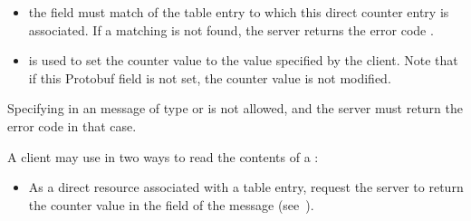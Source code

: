 \documentclass[11pt]{article}
\begin{document}
{\begin{itemize}
\item{}
the  field must match  of the table entry
to which this direct counter entry is associated. If a matching 
is not found, the server returns the error code .%

\item{}
 is used to set the counter value to the value specified by the
client. Note that if this Protobuf field is not set, the counter value is not
modified.%
\end{itemize}%

\noindent{}Specifying  in an  message of type  or
 is not allowed, and the server must return the error code
 in that case.%

A client may use  in two ways to read the contents of a
:%

\begin{itemize}%

\item{}
As a direct resource associated with a table entry, request the server to
return the counter value in the  field of the  message
(see~).%


\end{itemize}}
\end{document}
